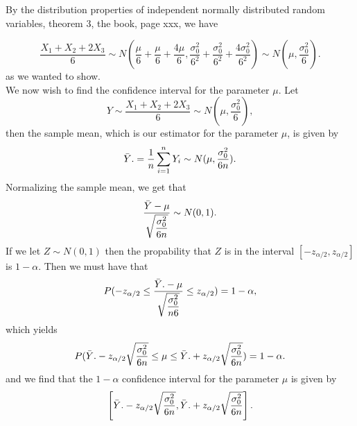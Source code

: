 \documentclass{article}
\begin{document}
By the distribution properties of independent normally distributed random variables, theorem 3, the book, page xxx, we have

\begin{equation}
    \dfrac{X_1 + X_2 + 2X_3}{6} \sim N(\frac{\mu}{6} + \frac{\mu}{6} + \frac{4\mu}{6} , \dfrac{\sigma_0^2}{6^2} + \dfrac{\sigma_0^2}{6^2} + \dfrac{4\sigma_0^2}{6^2} ) \sim N(\mu, \dfrac{\sigma_0^2}{6}).
\end{equation}
as we wanted to show.\\

We now wish to find the confidence interval for the parameter \( \mu \). Let
\begin{equation}
    Y \sim \dfrac{X_1 + X_2 + 2X_3}{6} \sim N(\mu, \dfrac{\sigma_0^2}{6}),
\end{equation}
then the sample mean, which is our estimator for the parameter \( \mu \), is given by
\begin{equation}
    \Bar{Y}. = \dfrac{1}{n} \sum_{i=1}^{n} Y_i \sim  N(\mu, \dfrac{\sigma_0^2}{6n}).
\end{equation}
Normalizing the sample mean, we get that
\begin{equation}
    \dfrac{\Bar{Y} - \mu}{\sqrt{\dfrac{\sigma_0^2}{6n}}} \sim N(0, 1).
\end{equation}
If we let $Z \sim N(0,1)$ then the propability that $Z$ is in the interval $[-z_{\alpha/2}, z_{\alpha/2}]$ is $1-\alpha$. Then we must have that
\begin{equation}
    P(-z_{\alpha/2} \leq \dfrac{\Bar{Y}. - \mu}{\sqrt{\dfrac{\sigma_0^2}{n6}}} \leq z_{\alpha/2}) = 1 - \alpha,
\end{equation}
which yields
\begin{equation}
    P(\Bar{Y}. - z_{\alpha/2} \sqrt{\dfrac{\sigma_0^2}{6n}} \leq \mu \leq \Bar{Y}. + z_{\alpha/2} \sqrt{\dfrac{\sigma_0^2}{6n}}) = 1 - \alpha.
\end{equation}
and we find that the $1-\alpha$ confidence interval for the parameter \( \mu \) is given by
\begin{equation}
    \left[ \Bar{Y}. - z_{\alpha/2} \sqrt{\dfrac{\sigma_0^2}{6n}}, \Bar{Y}. + z_{\alpha/2} \sqrt{\dfrac{\sigma_0^2}{6n}} \right].
\end{equation}
\end{document}
